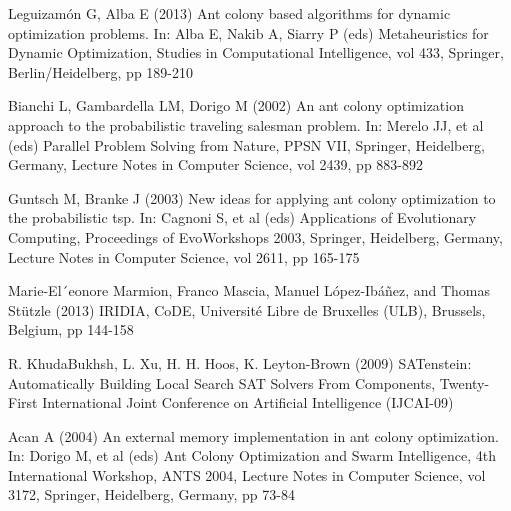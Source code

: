\documentclass[12pt]{article}
\begin{document}
\begin{thebibliography}{1}
 Leguizam{\'o}n G, Alba E (2013) Ant colony based algorithms for dynamic optimization problems. In: Alba E, Nakib A, Siarry P (eds) Metaheuristics for Dynamic Optimization, Studies in Computational Intelligence, vol 433, Springer, Berlin/Heidelberg, pp 189-210
 
 Bianchi L, Gambardella LM, Dorigo M (2002) An ant colony optimization approach to the probabilistic traveling salesman problem. In: Merelo JJ, et al (eds) Parallel Problem Solving from Nature, PPSN VII, Springer, Heidelberg, Germany, Lecture Notes in Computer Science, vol 2439, pp 883-892

 Guntsch M, Branke J (2003) New ideas for applying ant colony optimization to the probabilistic tsp. In: Cagnoni S, et al (eds) Applications of Evolutionary Computing, Proceedings of EvoWorkshops 2003, Springer, Heidelberg, Germany, Lecture Notes in Computer Science, vol 2611, pp 165-175

 Marie-El´eonore Marmion, Franco Mascia, Manuel L{\'o}pez-Ib{\'a}{\~n}ez, and Thomas St{\"u}tzle (2013) IRIDIA, CoDE, Universit{\'e} Libre de Bruxelles (ULB), Brussels, Belgium, pp 144-158

 R. KhudaBukhsh, L. Xu, H. H. Hoos, K. Leyton-Brown (2009) SATenstein: Automatically Building Local Search SAT Solvers From Components, Twenty-First International Joint Conference on Artificial Intelligence (IJCAI-09)

 Acan A (2004) An external memory implementation in ant colony optimization. In: Dorigo M, et al (eds) Ant Colony Optimization and Swarm Intelligence, 4th International Workshop, ANTS 2004, Lecture Notes in Computer Science, vol 3172, Springer, Heidelberg, Germany, pp 73-84

\end{thebibliography}

 
\end{document}
